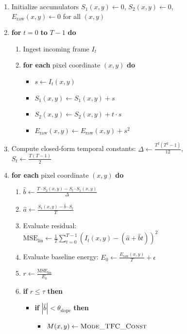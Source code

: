 \begin{figure}[h]
\begin{minipage}{0.95\linewidth}
\begin{enumerate}
    \item Initialize accumulators $S_1(x, y) \leftarrow 0$, $S_2(x, y) \leftarrow 0$, $E_{\text{raw}}(x, y) \leftarrow 0$ for all $(x, y)$
    \item \textbf{for} $t = 0$ \textbf{to} $T-1$ \textbf{do}
    \begin{enumerate}
        \item Ingest incoming frame $I_t$
        \item \textbf{for each} pixel coordinate $(x, y)$ \textbf{do}
        \begin{itemize}
            \item $s \leftarrow I_t(x, y)$
            \item $S_1(x, y) \leftarrow S_1(x, y) + s$
            \item $S_2(x, y) \leftarrow S_2(x, y) + t \cdot s$
            \item $E_{\text{raw}}(x, y) \leftarrow E_{\text{raw}}(x, y) + s^2$
        \end{itemize}
    \end{enumerate}
    \item Compute closed-form temporal constants: $\Delta \leftarrow \frac{T^2(T^2-1)}{12}$, $S_t \leftarrow \frac{T(T-1)}{2}$
    \item \textbf{for each} pixel coordinate $(x, y)$ \textbf{do}
    \begin{enumerate}
        \item $\hat{b} \leftarrow \frac{T \cdot S_2(x, y) - S_t \cdot S_1(x, y)}{\Delta}$
        \item $\hat{a} \leftarrow \frac{S_1(x, y) - \hat{b} \cdot S_t}{T}$
        \item Evaluate residual: $\text{MSE}_{\text{lin}} \leftarrow \frac{1}{T} \sum_{t=0}^{T-1} (I_t(x, y) - (\hat{a} + \hat{b}t))^2$
        \item Evaluate baseline energy: $E_0 \leftarrow \frac{E_{\text{raw}}(x, y)}{T} + \epsilon$
        \item $r \leftarrow \frac{\text{MSE}_{\text{lin}}}{E_0}$
        \item \textbf{if} $r \le \tau$ \textbf{then}
        \begin{itemize}
            \item \textbf{if} $|\hat{b}| < \theta_{\text{slope}}$ \textbf{then}
            \begin{itemize}
                \item $M(x, y) \leftarrow \textsc{Mode\_TFC\_Const}$

\end{itemize}
\end{itemize}
\end{enumerate}
\end{enumerate}
\end{minipage}
\end{figure}
